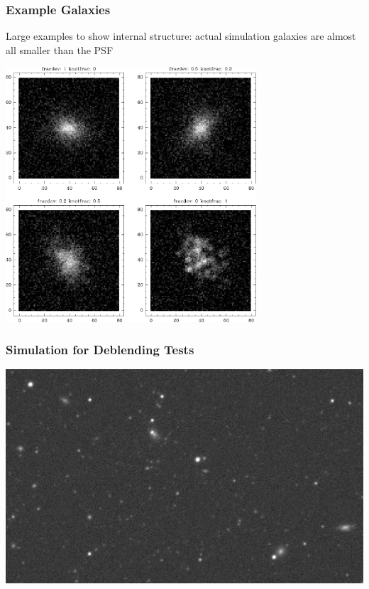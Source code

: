 \documentclass{beamer}
\begin{document}
{

    \frame
    {
        \frametitle{Example Galaxies}
     
        {\small Large examples to show internal structure:  actual simulation
        galaxies are almost all smaller than the PSF }

        \begin{center}
            \includegraphics[width=0.7\textwidth]{mosaic-009086.pdf}
            \newline
        \end{center}

    }


}



\frame
{
    \frametitle{Simulation for Deblending Tests }
 
    \begin{center}
        \includegraphics[width=\columnwidth]{nbrsim-003f-009969-image-crop.jpg}
    \end{center}

}
\end{document}
